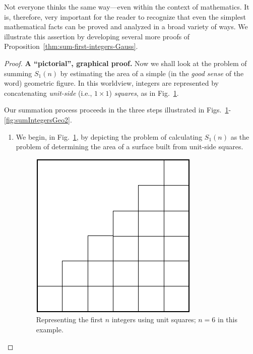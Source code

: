 \bigskip

Not everyone thinks the same way---even within the context of mathematics.  It is, therefore, very important for the reader to recognize that even the simplest mathematical facts can be proved and analyzed in a broad variety of ways.  We illustrate this assertion by developing several more proofs of Proposition~\ref{thm:sum-first-integers-Gauss}.

\begin{proof}
{\bf A ``pictorial'', graphical proof.}
Now we shall look at the problem of summing $S_1(n)$ by estimating the area of a simple (in the \textit{good sense} of the word) geometric figure.  In this worldview, integers are represented by concatenating {\it unit-side} (i.e., $1 \times 1$) {\it squares}, as in Fig.~\ref{fig:sumIntegersGeo1}.

\medskip

Our summation process proceeds in the three steps illustrated in Figs.~\ref{fig:sumIntegersGeo1}-\ref{fig:sumIntegersGeo2}.
\begin{enumerate}
\item
We begin, in Fig.~\ref{fig:sumIntegersGeo1}, by depicting the problem of calculating $S_1(n)$ as the problem of determining the area of a surface built from unit-side squares.
\begin{figure}[htb]
\begin{center}
       \includegraphics[scale=0.33]{FiguresMaths/SumIntegersGeometricBasis}
\caption{Representing the first $n$ integers using unit squares; $n=6$ in this example.}
       \label{fig:sumIntegersGeo1}
\end{center}
\end{figure}


\end{enumerate}
\end{proof}
